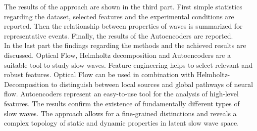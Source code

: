 The results of the approach are shown in the third part. First simple statistics regarding the dataset, selected features and the experimental conditions are reported. Then the relationship between properties of waves is summarized for representative events. Finally, the results of the Autoencoders are reported. \\
In the last part the findings regarding the methods and the achieved results are discussed. Optical Flow, Helmholtz decomposition and Autoencoders are a suitable tool to study slow waves. Feature engineering helps to select relevant and robust features. Optical Flow can be used in combination with Helmholtz-Decomposition to distinguish between local sources and global pathways of neural flow. Autoencoders represent an easy-to-use tool for the analysis of high-level features. The results confirm the existence of fundamentally different types of slow waves. The approach allows for a fine-grained distinctions and reveals a complex topology of static and dynamic properties in latent slow wave space.\\
